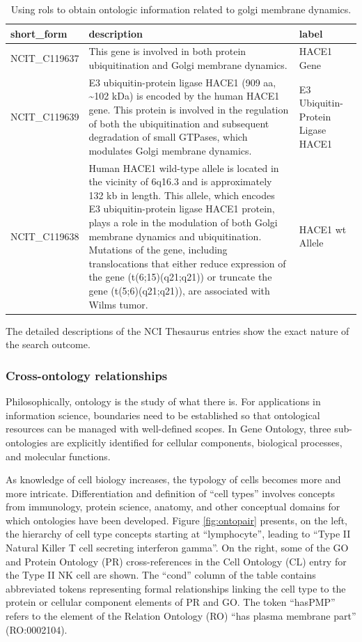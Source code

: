 \begin{table}
\caption{Using rols to obtain ontologic information related to
golgi membrane dynamics. \label{tab:tab-golg}}
\begin{tabular}{lp{5cm}p{8cm}}
\toprule
short\_form & description & label\\
\midrule
NCIT\_C119637 & This gene is involved in both protein ubiquitination and Golgi membrane dynamics. & HACE1 Gene\\
NCIT\_C119639 & E3 ubiquitin-protein ligase HACE1 (909 aa, \textasciitilde{}102 kDa) is encoded by the human HACE1 gene. This protein is involved in the regulation of both the ubiquitination and subsequent degradation of small GTPases, which modulates Golgi membrane dynamics. & E3 Ubiquitin-Protein Ligase HACE1\\
NCIT\_C119638 & Human HACE1 wild-type allele is located in the vicinity of 6q16.3 and is approximately 132 kb in length. This allele, which encodes E3 ubiquitin-protein ligase HACE1 protein, plays a role in the modulation of both Golgi membrane dynamics and ubiquitination. Mutations of the gene, including translocations that either reduce expression of the gene (t(6;15)(q21;q21)) or truncate the gene (t(5;6)(q21;q21)), are associated with Wilms tumor. & HACE1 wt Allele\\
\bottomrule
\end{tabular}
\end{table}

The detailed descriptions of the NCI Thesaurus entries show
the exact nature of the search outcome.

\subsubsection{Cross-ontology relationships}\label{cross-ontology-relationships}

Philosophically, ontology is the study of what there is. For
applications in information
science,
boundaries need to be established so that ontological
resources can be managed with well-defined scopes. In Gene
Ontology, three sub-ontologies are explicitly identified for
cellular components, biological processes, and molecular functions.

As knowledge of cell biology increases, the typology of
cells becomes more and more intricate. Differentiation
and definition
of ``cell types'' involves concepts from immunology,
protein science, anatomy, and other conceptual domains
for which ontologies have been developed. Figure \ref{fig:ontopair}
presents, on the left, the hierarchy of cell type concepts starting at ``lymphocyte'',
leading to ``Type II Natural Killer T cell secreting interferon gamma''.
On the right, some of the GO and Protein Ontology (PR) cross-references
in the Cell Ontology (CL) entry for the Type II NK cell are shown.
The ``cond'' column of the table contains abbreviated tokens
representing formal relationships linking the cell type
to the protein or cellular component elements of PR and GO.
The token ``hasPMP'' refers to the element of the Relation Ontology
(RO) ``has plasma membrane part'' (RO:0002104).

